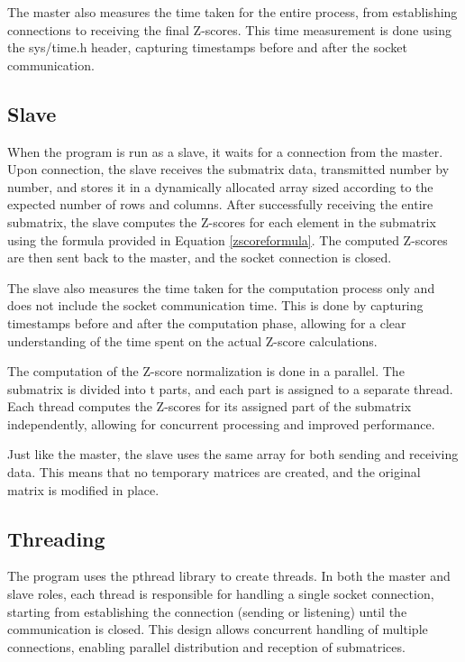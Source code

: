 \documentclass[journal]{./IEEE/IEEEtran}
\begin{document}
The master also measures the time taken for the entire process, from establishing connections to receiving the final Z-scores. This time measurement is done using the sys/time.h header, capturing timestamps before and after the socket communication.

\subsection{Slave}
When the program is run as a slave, it waits for a connection from the master. Upon connection, the slave receives the submatrix data, transmitted number by number, and stores it in a dynamically allocated array sized according to the expected number of rows and columns. After successfully receiving the entire submatrix, the slave computes the Z-scores for each element in the submatrix using the formula provided in Equation \ref{zscoreformula}. The computed Z-scores are then sent back to the master, and the socket connection is closed.

The slave also measures the time taken for the computation process only and does not include the socket communication time. This is done by capturing timestamps before and after the computation phase, allowing for a clear understanding of the time spent on the actual Z-score calculations.

The computation of the Z-score normalization is done in a parallel. The submatrix is divided into t parts, and each part is assigned to a separate thread. Each thread computes the Z-scores for its assigned part of the submatrix independently, allowing for concurrent processing and improved performance.

Just like the master, the slave uses the same array for both sending and receiving data. This means that no temporary matrices are created, and the original matrix is modified in place.

\subsection{Threading}
The program uses the pthread library to create threads. In both the master and slave roles, each thread is responsible for handling a single socket connection, starting from establishing the connection (sending or listening) until the communication is closed. This design allows concurrent handling of multiple connections, enabling parallel distribution and reception of submatrices.
\end{document}
